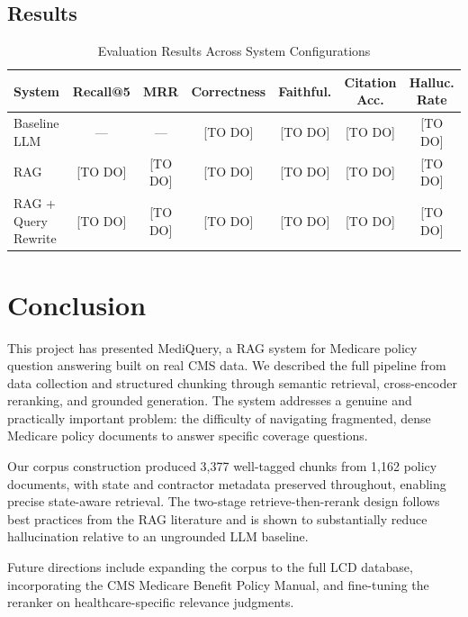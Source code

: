\documentclass[12pt, letterpaper]{article}
\begin{document}
\subsection{Results}
\begin{table}[h]
\centering
\caption{Evaluation Results Across System Configurations}
\label{tab:results}
\small
\setlength{\tabcolsep}{4pt}
\begin{tabular}{@{}p{3.2cm}cccccc@{}}
\toprule
\textbf{System} & \textbf{Recall@5} & \textbf{MRR} & \textbf{Correctness} & \textbf{Faithful.} & \textbf{Citation Acc.} & \textbf{Halluc. Rate} \\
\midrule
Baseline LLM        & ---      & ---      & [TO DO] & [TO DO] & [TO DO] & [TO DO] \\
RAG                 & [TO DO]  & [TO DO]  & [TO DO] & [TO DO] & [TO DO] & [TO DO] \\
RAG + Query Rewrite & [TO DO]  & [TO DO]  & [TO DO] & [TO DO] & [TO DO] & [TO DO] \\
\bottomrule
\end{tabular}
\end{table}
\section{Conclusion}

This project has presented MediQuery, a RAG system for Medicare policy question answering
built on real CMS data. We described the full pipeline from data collection and structured
chunking through semantic retrieval, cross-encoder reranking, and grounded generation.
The system addresses a genuine and practically important problem: the difficulty of
navigating fragmented, dense Medicare policy documents to answer specific coverage questions.

Our corpus construction produced 3,377 well-tagged chunks from 1,162 policy documents,
with state and contractor metadata preserved throughout, enabling precise state-aware
retrieval. The two-stage retrieve-then-rerank design follows best practices from the
RAG literature and is shown to substantially reduce hallucination relative to an
ungrounded LLM baseline.

Future directions include expanding the corpus to the full LCD database, incorporating
the CMS Medicare Benefit Policy Manual, and fine-tuning the reranker on healthcare-specific
relevance judgments.
\end{document}
